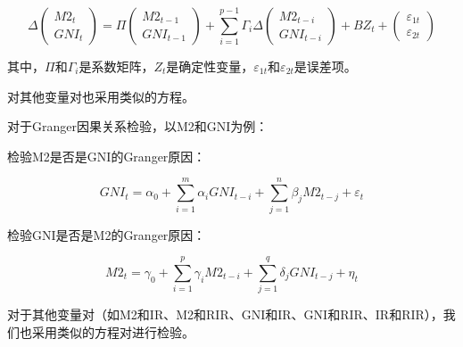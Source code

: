 \begin{equation}
	\Delta \begin{pmatrix} M2_t \\ GNI_t \end{pmatrix} = \Pi \begin{pmatrix} M2_{t-1} \\ GNI_{t-1} \end{pmatrix} + \sum_{i=1}^{p-1} \Gamma_i \Delta \begin{pmatrix} M2_{t-i} \\ GNI_{t-i} \end{pmatrix} + BZ_t + \begin{pmatrix} \varepsilon_{1t} \\ \varepsilon_{2t} \end{pmatrix}
\end{equation}

其中，$\Pi$和$\Gamma_i$是系数矩阵，$Z_t$是确定性变量，$\varepsilon_{1t}$和$\varepsilon_{2t}$是误差项。

对其他变量对也采用类似的方程。


对于Granger因果关系检验，以M2和GNI为例：

检验M2是否是GNI的Granger原因：

\begin{equation}
	GNI_t = \alpha_0 + \sum_{i=1}^{m} \alpha_i GNI_{t-i} + \sum_{j=1}^{n} \beta_j M2_{t-j} + \varepsilon_t
\end{equation}

检验GNI是否是M2的Granger原因：

\begin{equation}
	M2_t = \gamma_0 + \sum_{i=1}^{p} \gamma_i M2_{t-i} + \sum_{j=1}^{q} \delta_j GNI_{t-j} + \eta_t
\end{equation}

对于其他变量对（如M2和IR、M2和RIR、GNI和IR、GNI和RIR、IR和RIR），我们也采用类似的方程对进行检验。









